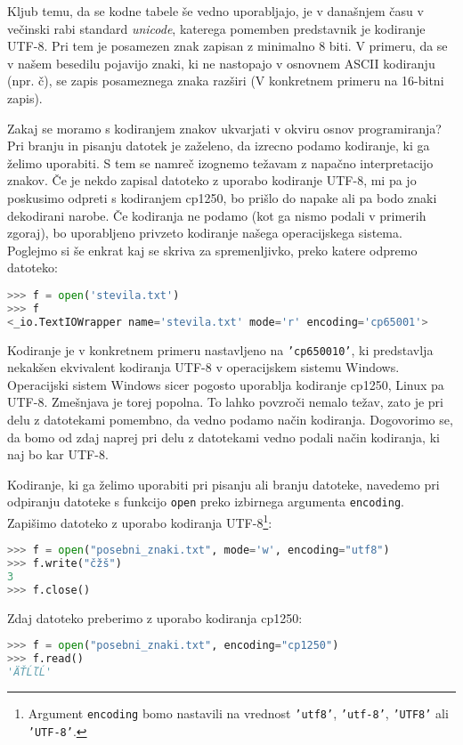 Kljub temu, da se kodne tabele še vedno uporabljajo, je v današnjem času v večinski rabi standard \emph{unicode}, katerega pomemben predstavnik je kodiranje UTF-8. Pri tem je posamezen znak zapisan z minimalno 8 biti. V primeru, da se v našem besedilu pojavijo znaki, ki ne nastopajo v osnovnem ASCII kodiranju (npr. č), se zapis posameznega znaka razširi (V konkretnem primeru na 16-bitni zapis).

Zakaj se moramo s kodiranjem znakov ukvarjati v okviru osnov programiranja? Pri branju in pisanju datotek je zaželeno, da izrecno podamo kodiranje, ki ga želimo uporabiti. S tem se namreč izognemo težavam z napačno interpretacijo znakov. Če je nekdo zapisal datoteko z uporabo kodiranje UTF-8, mi pa jo poskusimo odpreti s kodiranjem cp1250, bo prišlo do napake ali pa bodo znaki dekodirani narobe. Če kodiranja ne podamo (kot ga nismo podali v primerih zgoraj), bo uporabljeno privzeto kodiranje našega operacijskega sistema. Poglejmo si še enkrat kaj se skriva za spremenljivko, preko katere odpremo datoteko:
\begin{lstlisting}[language=Python, showstringspaces=false]
>>> f = open('stevila.txt')
>>> f 
<_io.TextIOWrapper name='stevila.txt' mode='r' encoding='cp65001'>
\end{lstlisting}
Kodiranje  je v konkretnem primeru nastavljeno na \texttt{'cp650010'}, ki predstavlja nekakšen ekvivalent kodiranja UTF-8 v operacijskem sistemu Windows. Operacijski sistem Windows sicer pogosto uporablja kodiranje cp1250, Linux pa UTF-8. Zmešnjava je torej popolna. To lahko povzroči nemalo težav, zato je pri delu z datotekami pomembno, da vedno podamo način kodiranja. Dogovorimo se, da bomo od zdaj naprej pri delu z datotekami vedno podali način kodiranja, ki naj bo kar UTF-8. 

Kodiranje, ki ga želimo uporabiti pri pisanju ali branju datoteke, navedemo pri odpiranju datoteke s funkcijo \texttt{open} preko izbirnega argumenta \texttt{encoding}. Zapišimo datoteko z uporabo kodiranja UTF-8\footnote{Argument \texttt{encoding} bomo nastavili na vrednost \texttt{'utf8'}, \texttt{'utf-8'}, \texttt{'UTF8'} ali \texttt{'UTF-8'}.}:
\begin{lstlisting}[language=Python, showstringspaces=false]
>>> f = open("posebni_znaki.txt", mode='w', encoding="utf8")
>>> f.write("čžš")
3
>>> f.close()
\end{lstlisting}
Zdaj datoteko preberimo z uporabo kodiranja cp1250:
\begin{lstlisting}[language=Python, showstringspaces=false]
>>> f = open("posebni_znaki.txt", encoding="cp1250")
>>> f.read()
'ÄŤĹľĹ'
\end{lstlisting}

